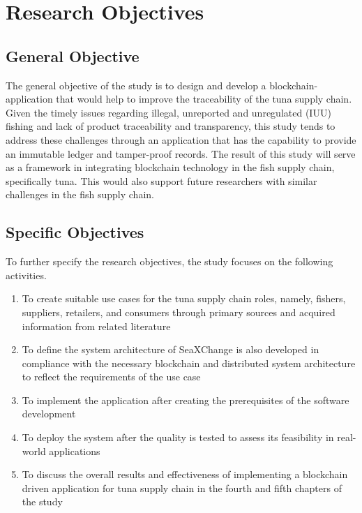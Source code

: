 \section{Research Objectives}
\label{sec:researchobjectives}

\subsection{General Objective}
\label{sec:generalobjective}

The general objective of the study is to design and develop a blockchain-application that would help to improve the traceability of the tuna supply chain. Given the timely issues regarding illegal, unreported and unregulated (IUU) fishing and lack of product traceability and transparency,  this study tends to address these challenges through an application that has the capability to provide an immutable ledger and tamper-proof records. The result of this study will serve as a framework in integrating blockchain technology in the fish supply chain, specifically tuna. This would also support future researchers with similar challenges in the fish supply chain.


\subsection{Specific Objectives}
\label{sec:specificobjectives}

To further specify the research objectives, the study focuses on the following activities. 

\begin{enumerate}
	
	\item To create suitable use cases for the tuna supply chain roles, namely, fishers, suppliers, retailers, and consumers through primary sources and acquired information from related literature
	\item To define the system architecture of SeaXChange is also developed in compliance with the necessary blockchain and distributed system architecture to reflect the requirements of the use case
	\item To implement the application after creating the prerequisites of the software development  
	\item To deploy the system after the quality is tested to assess its feasibility in real-world applications 
	\item To discuss the overall results and effectiveness of implementing a blockchain driven application for tuna supply chain in the fourth and fifth chapters of the study
\end{enumerate}



